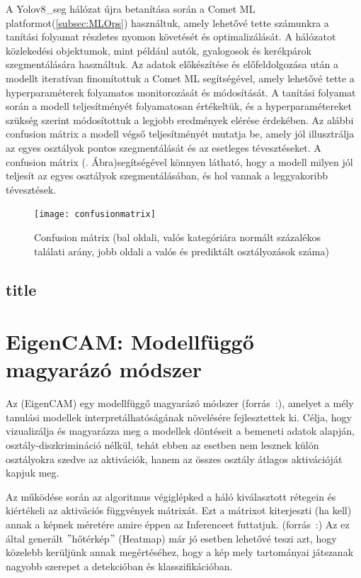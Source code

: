 \documentclass[12pt,oneside,a4paper]{article}
\newcommand{\newsection}[1]{\clearpage\section{#1}}\label{makro}
\theoremstyle{remark}
\begin{document}
   A Yolov8\_seg hálózat újra betanítása során a Comet ML platformot(\ref{subsec:MLOps}) használtuk, amely lehetővé tette számunkra a tanítási folyamat részletes nyomon követését és optimalizálását. A hálózatot közlekedési objektumok, mint például autók, gyalogosok és kerékpárok szegmentálására használtuk. Az adatok előkészítése és előfeldolgozása után a modellt iteratívan finomítottuk a Comet ML segítségével, amely lehetővé tette a hyperparaméterek folyamatos monitorozását és módosítását. A tanítási folyamat során a modell teljesítményét folyamatosan értékeltük, és a hyperparamétereket szükség szerint módosítottuk a legjobb eredmények elérése érdekében. Az alábbi confusion mátrix a modell végső teljesítményét mutatja be, amely jól illusztrálja az egyes osztályok pontos szegmentálását és az esetleges tévesztéseket. A confusion mátrix (. Ábra)segítségével könnyen látható, hogy a modell milyen jól teljesít az egyes osztályok szegmentálásában, és hol vannak a leggyakoribb tévesztések.
   \begin{figure}[ht]
   \centering
   \texttt{[image: confusionmatrix]}
   \caption{Confusion mátrix (bal oldali, valós kategóriára normált százalékos találati arány, jobb oldali a valós és prediktált osztályozások száma)}
   \label{fig:confusionmatrix}
   \end{figure}
	
	\subsection{title}
	
	
	\newsection{EigenCAM: Modellfüggő magyarázó módszer}\label{sec:eigencam:-modellfuggo-magyarazo}
	Az  (\gls{EigenCAM}) egy modellfüggő magyarázó módszer (forrás~\cite{pytorch-grad-cam}:), amelyet a mély tanulási
	modellek interpretálhatóságának növelésére fejlesztettek ki.
	Célja, hogy vizualizálja és magyarázza meg a modellek döntéseit a bemeneti adatok alapján,
	osztály-diszkrimináció nélkül, tehát ebben az esetben nem lesznek külön osztályokra szedve az aktivációk, hanem az
	összes osztály átlagos aktivációját kapjuk meg.
	
	Az  működése során az algoritmus végiglépked a háló kiválasztott rétegein és kiértékeli
	az aktivációs függvények mátrixát.
	Ezt a mátrixot kiterjeszti (ha kell) annak a képnek méretére amire éppen az \gls{Inference}et futtatjuk.
	(forrás~\cite{muhammad2020eigencam}:)
	Az ez által generált \("\)hőtérkép\("\) (Heatmap) már jó esetben lehetővé teszi azt, hogy közelebb kerüljünk
	annak megértéséhez, hogy a kép mely tartományai játszanak nagyobb szerepet a detekcióban és klasszifikációban.
	
\end{document}
